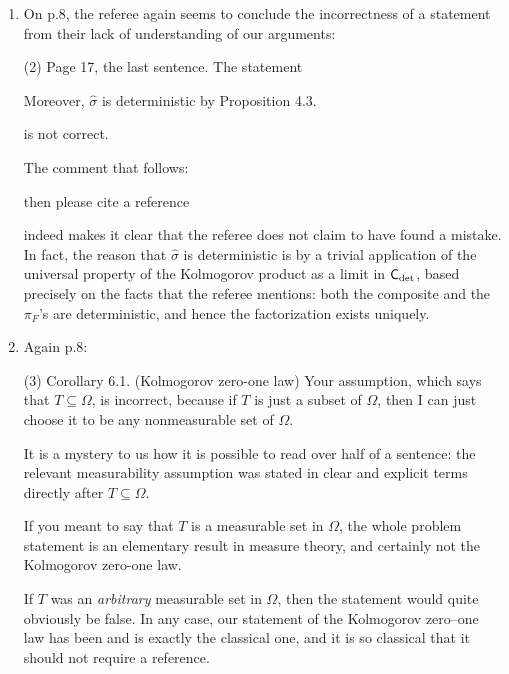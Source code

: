 \documentclass[11pt]{article}
\begin{document}
\begin{enumerate}[resume,label=(\alph*).]
		Perhaps the referee's point is that this preservation condition never appears in the context of Kolmogorov's extension theorem. This is true, and the reason is simple: it \emph{automatically holds} in $\BorelStoch$, as we have explained in Example 3.6. Hence there is no reason to state it explicitly in the standard probability context.
	\item On p.8, the referee again seems to conclude the incorrectness of a statement from their lack of understanding of our arguments:
		\begin{displayquote}
		(2) Page 17, the last sentence. The statement
			\begin{displayquote}
			Moreover, $\hat{\sigma}$ is deterministic by Proposition 4.3.
			\end{displayquote}
		is not correct.
		\end{displayquote}
		The comment that follows:
			\begin{displayquote}
				then please cite a reference	
			\end{displayquote}
		indeed makes it clear that the referee does not claim to have found a mistake. In fact, the reason that $\hat{\sigma}$ is deterministic is by a trivial application of the universal property of the Kolmogorov product as a limit in $\mathsf{C}_{\det}$, based precisely on the facts that the referee mentions: both the composite and the $\pi_F$'s are deterministic, and hence the factorization exists uniquely.
	\item Again p.8:
		\begin{displayquote}
			(3) Corollary 6.1. (Kolmogorov zero-one law) Your assumption, which says that
			$T \subseteq \Omega$, is incorrect, because if $T$ is just a subset of $\Omega$, then I can just choose
			it to be any nonmeasurable set of $\Omega$.
		\end{displayquote}
		It is a mystery to us how it is possible to read over half of a sentence: the relevant measurability assumption was stated in clear and explicit terms directly after $T \subseteq \Omega$.
		\begin{displayquote}
			If you
			meant to say that $T$ is a measurable set in $\Omega$, the whole problem statement is an
			elementary result in measure theory, and certainly not the Kolmogorov zero-one
			law.
		\end{displayquote}
		If $T$ was an \emph{arbitrary} measurable set in $\Omega$, then the statement would quite obviously be false. In any case, our statement of the Kolmogorov zero--one law has been and is exactly the classical one, and it is so classical that it should not require a reference.

\end{enumerate}
\end{document}
